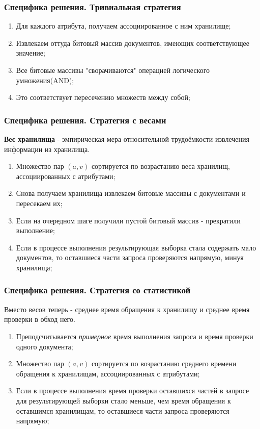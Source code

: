 \documentclass{beamer}
\begin{document}
\begin{frame}\frametitle{Специфика решения. Тривиальная стратегия}
    \begin{enumerate}
        \item Для каждого атрибута, получаем ассоциированное с ним хранилище;
        \item Извлекаем оттуда битовый массив документов, имеющих соответствующее значение;
        \item Все битовые массивы "сворачиваются" операцией логического умножения(AND);
        \item Это соответствует пересечению множеств между собой; 
    \end{enumerate}
\end{frame}

\begin{frame}\frametitle{Специфика решения. Стратегия с весами}
    \textbf{Вес хранилища} - эмпирическая мера относительной трудоёмкости извлечения информации из хранилища.
    \begin{enumerate}
        \item Множество пар $(a, v)$ сортируется по возрастанию веса хранилищ, ассоциированных с атрибутами;
        \item Снова получаем хранилища извлекаем битовые массивы с документами и пересекаем их;
        \item Если на очередном шаге получили пустой битовый массив - прекратили выполнение;
        \item Если в процессе выполнения результирующая выборка стала содержать мало документов, то оставшиеся части запроса проверяются напрямую, минуя хранилища;
    \end{enumerate}
\end{frame}

\begin{frame}\frametitle{Специфика решения. Стратегия со статистикой}
    Вместо весов теперь - среднее время обращения к хранилищу и среднее время проверки в обход него.
    \begin{enumerate}
        \item Преподсчитывается \textit{примерное} время выполнения запроса и время проверки одного документа;
        \item Множество пар $(a, v)$ сортируется по возрастанию среднего времени обращения к хранилищам, ассоциированных с атрибутами;
        \item Если в процессе выполнения время проверки оставшихся частей в запросе для результирующей выборки стало меньше, чем время обращения к оставшимся хранилищам, то оставшиеся части запроса проверяются напрямую;
    \end{enumerate}
\end{frame}
\end{document}
